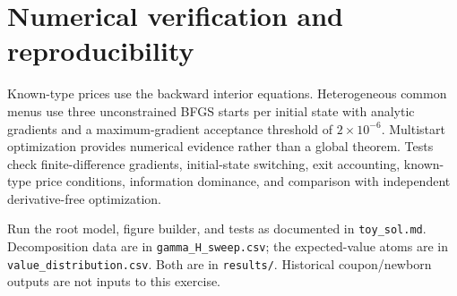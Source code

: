 \documentclass[11pt]{article}
\begin{document}
\section{Numerical verification and reproducibility}
Known-type prices use the backward interior equations. Heterogeneous common menus use three unconstrained BFGS starts per initial state with analytic gradients and a maximum-gradient acceptance threshold of $2\times10^{-6}$. Multistart optimization provides numerical evidence rather than a global theorem. Tests check finite-difference gradients, initial-state switching, exit accounting, known-type price conditions, information dominance, and comparison with independent derivative-free optimization.

Run the root model, figure builder, and tests as documented in \texttt{toy\_sol.md}. Decomposition data are in \texttt{gamma\_H\_sweep.csv}; the expected-value atoms are in \texttt{value\_distribution.csv}. Both are in \texttt{results/}. Historical coupon/newborn outputs are not inputs to this exercise.
\end{document}
